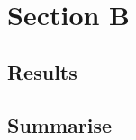 \section*{Section B}
\label{sec:Section B}
\FloatBarrier %


\subsection*{Results}


\subsection*{Summarise}